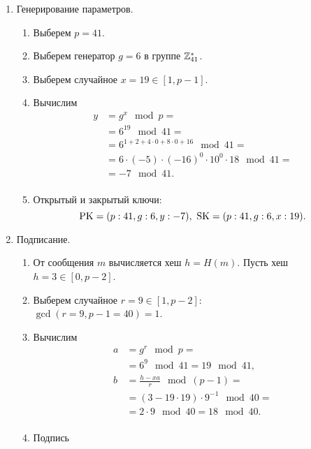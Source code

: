 \begin{enumerate}
    \item Генерирование параметров.
        \begin{enumerate}
            \item Выберем $p=41$.
            \item Выберем генератор $g=6$ в группе $\mathbb{Z}_{41}^*$.
            \item Выберем случайное $x = 19 \in [1, p-1]$.%
            \item Вычислим
                \[ \begin{array}{ll}
                    y & = g^x \mod p = \\
                    & = 6^{19} \mod 41 = \\
                    & = 6^{1 + 2 + 4 \cdot 0 + 8 \cdot 0 + 16} \mod 41 = \\
                    & = 6 \cdot (-5) \cdot (-16)^0 \cdot 10^0 \cdot 18 \mod 41 = \\
                    & = -7 \mod 41. \\
                \end{array} \]
            \item Открытый и закрытый ключи:
                \[ \textrm{PK} = (p:41, g:6, y:-7), ~ \textrm{SK} = (p:41, g:6, x:19). \]
        \end{enumerate}
    \item Подписание.
        \begin{enumerate}
            \item От сообщения $m$ вычисляется хеш $h = H(m)$. Пусть хеш $h  = 3 \in [0, p-2]$.
            \item Выберем случайное $r = 9 \in [1, p-2]$: \\
                $\gcd(r=9, p-1 = 40) = 1$.
            \item Вычислим
                \[ \begin{array}{ll}
                    a & = g^r \mod p = \\
                      & = 6^9 \mod 41 = 19 \mod 41, \\
                    b & = \frac{h - xa}{r} \mod (p-1) = \\
                      & = (3 - 19 \cdot 19) \cdot 9^{-1} \mod 40 = \\
                      & = 2 \cdot 9 \mod 40 = 18 \mod 40. \\
                \end{array} \]
            \item Подпись

\end{enumerate}
\end{enumerate}

